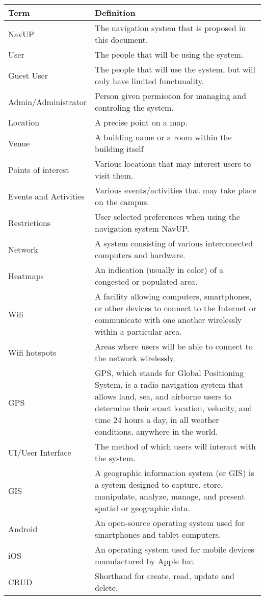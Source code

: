 \begin{center}
    \begin{tabular}{| l | p{7cm} |}
    \hline
    \textbf{Term} & \textbf{Definition} \\ \hline
	NavUP & The navigation system that is proposed in this document. \\ \hline
	User & The people that will be using the system. \\ \hline
	Guest User & The people that will use the system, but will only have limited functunality. \\ \hline
	Admin/Administrator & Person given permission for managing and controling the system. \\ \hline
	Location & A precise point on a map. \\ \hline
	Venue & A building name or a room within the building itself \\ \hline
	Points of interest & Various locations that may interest users to visit them. \\ \hline
	Events and Activities & Various events/activities that may take place on the campus. \\ \hline
	Restrictions & User selected preferences when using the navigation system NavUP. \\ \hline
	Network & A system consisting of various interconected computers and hardware. \\ \hline
	Heatmaps & An indication (usually in color) of a congested or populated area. \\ \hline
	Wifi & A facility allowing computers, smartphones, or other devices to connect to the Internet or communicate with one another wirelessly within a particular area. \\ \hline
	Wifi hotspots & Areas where users will be able to connect to the network wirelessly. \\ \hline    
	GPS & GPS, which stands for Global Positioning System, is a radio navigation system that allows land, sea, and airborne users to determine their exact location, velocity, and time 24 hours a day, in all weather conditions, anywhere in the world. \\ \hline
	UI/User Interface & The method of which users will interact with the system. \\ \hline
	GIS & A geographic information system (or GIS) is a system designed to capture, store, manipulate, analyze, manage, and present spatial or geographic data. \\ \hline
	Android & An open-source operating system used for smartphones and tablet computers. \\ \hline
	iOS & An operating system used for mobile devices manufactured by Apple Inc. \\ \hline
  CRUD & Shorthand for create, read, update and delete. \\ \hline
    \end{tabular}
\end{center}

